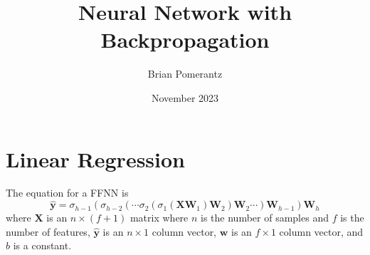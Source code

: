 \documentclass{article}
\title{Neural Network with Backpropagation}
\author{Brian Pomerantz}
\date{November 2023}
\begin{document}
\maketitle

\section{Linear Regression}
The equation for a FFNN is
\begin{equation}
    \hat{\mathbf{y}} = \sigma_{h-1}\left(\sigma_{h-2}\left(\cdots\sigma_2\left(\sigma_1(\mathbf{X}\mathbf{W}_1)\mathbf{W}_2\right)\mathbf{W}_2\cdots\right)\mathbf{W}_{h-1}\right)\mathbf{W}_h
    \label{eq:FFNN}
\end{equation}
where $\mathbf{X}$ is an $n\times (f+1)$ matrix where $n$ is the number of samples and $f$ is the number of features, $\hat{\mathbf{y}}$ is an $n\times 1$ column vector, $\mathbf{w}$ is an $f\times 1$ column vector, and $b$ is a constant.
\end{document}
